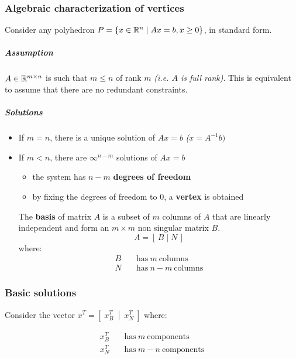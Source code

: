 \documentclass[english]{article}
\begin{document}
\subsubsection{Algebraic characterization of vertices}

Consider any polyhedron \(P = \left\{ x \in \mathbb{R}^n \mid   Ax = b, x \geq 0 \right\}\), in standard form.

\subparagraph*{Assumption}
\(A \in \mathbb{R}^{m \times n}\) is such that \(m \leq n\) of rank \(m\) \textit{(i.e. \(A\) is full rank)}.
This is equivalent to assume that there are no redundant constraints.

\subparagraph*{Solutions}
\begin{itemize}
  \item If \(m = n\), there is a unique solution of \(Ax = b\) \textit{(\(x = A^{-1} b)\)}
  \item If \(m < n\), there are \(\infty^{n-m}\) solutions of \(Ax = b\)
        \begin{itemize}
          \item the system has \(n-m\) \textbf{degrees of freedom}
          \item by fixing the degrees of freedom to \(0\), a \textbf{vertex} is obtained
        \end{itemize}

        The \textbf{basis} of matrix \(A\) is a subset of \(m\) columns of \(A\) that are linearly independent and form an \(m \times m\) non singular matrix \(B\).
        \[ A = [\, B \mid N \, ] \]
        where:
        \begin{align*}
          B \quad & \text{has} \ m \ \text{columns}   \\
          N \quad & \text{has} \ n-m \ \text{columns}
        \end{align*}
\end{itemize}

\subsubsection{Basic solutions}
\label{sec:basic-solutions}

Consider the vector \(x^T = \left[ \ x_B^T \ \middle\vert \ x_N^T \ \right]\) where:

\begin{align*}
  x_B^T \quad & \text{has} \ m \ \text{components}   \\
  x_N^T \quad & \text{has} \ m-n \ \text{components}
\end{align*}
\end{document}
